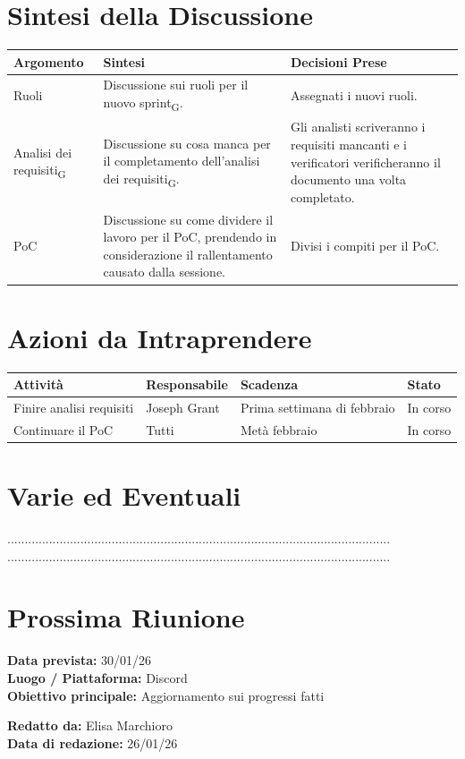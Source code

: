 \documentclass[a4paper,12pt]{article}
\newcommand{\gls}[1]{#1\textsubscript{G}}
\begin{document}
\section*{ Sintesi della Discussione}

\begin{longtable}{|p{}|p{}|p{}|}
\hline
\textbf{Argomento} & \textbf{Sintesi} & \textbf{Decisioni Prese} \\ \hline
Ruoli & Discussione sui ruoli per il nuovo \gls{sprint}. & Assegnati i nuovi ruoli.\\ \hline
\gls{Analisi dei requisiti} & Discussione su cosa manca per il completamento dell'\gls{analisi dei requisiti}.& Gli analisti scriveranno i requisiti mancanti e i verificatori verificheranno il documento una volta completato.\\ \hline
PoC & Discussione su come dividere il lavoro per il PoC, prendendo in considerazione il rallentamento causato dalla sessione. & Divisi i compiti per il PoC.\\ \hline
\end{longtable}
\newpage

\section*{ Azioni da Intraprendere}

\begin{longtable}{|p{}|p{}|p{}|p{}|}
\hline
\textbf{Attività} & \textbf{Responsabile} & \textbf{Scadenza} & \textbf{Stato} \\ \hline
Finire analisi requisiti & Joseph Grant & Prima settimana di febbraio & In corso \\ \hline
Continuare il PoC & Tutti & Metà febbraio & In corso\\ \hline
\end{longtable}


\section*{ Varie ed Eventuali}
..............................................................................................................\\
..............................................................................................................


\section*{ Prossima Riunione}
\textbf{Data prevista:} 30/01/26 \\
\textbf{Luogo / Piattaforma:} Discord \\
\textbf{Obiettivo principale:} Aggiornamento sui progressi fatti


\textbf{Redatto da:} Elisa Marchioro \\
\textbf{Data di redazione:} 26/01/26
\end{document}
